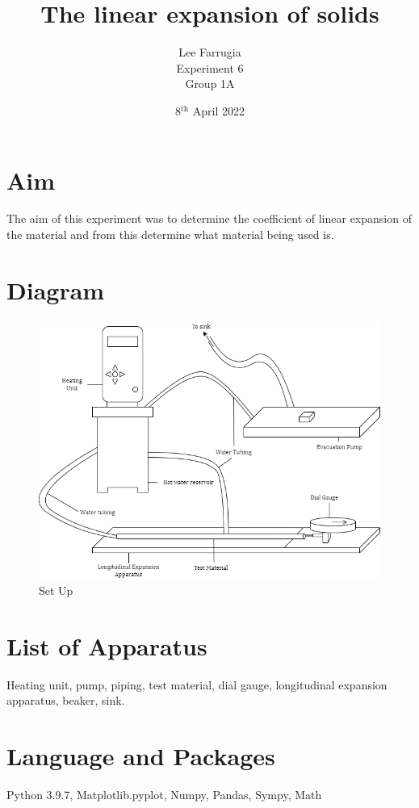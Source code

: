 \documentclass[12pt, a4paper]{article}
\title{The linear expansion of solids}
\author{Lee Farrugia \\ Experiment 6 \\ Group 1A}
\date{8$^{\text{th}}$ April 2022}
\begin{document}
\maketitle
\thispagestyle{titlepagestyle}
\pagestyle{mystyle}

\section*{Aim}
The aim of this experiment was to determine the coefficient of linear expansion of the material and from this determine what material being used is. 

\section*{Diagram}
\begin{figure}[H]
    \centering
    \includegraphics[width = \textwidth]{Experiment 6.png}
    \caption{Set Up}
    \label{fig: Apparatus}
\end{figure}

\section*{List of Apparatus}
Heating unit, pump, piping, test material, dial gauge, longitudinal expansion apparatus, beaker, sink.

\section*{Language and Packages}
Python 3.9.7, Matplotlib.pyplot, Numpy, Pandas, Sympy, Math
\end{document}
